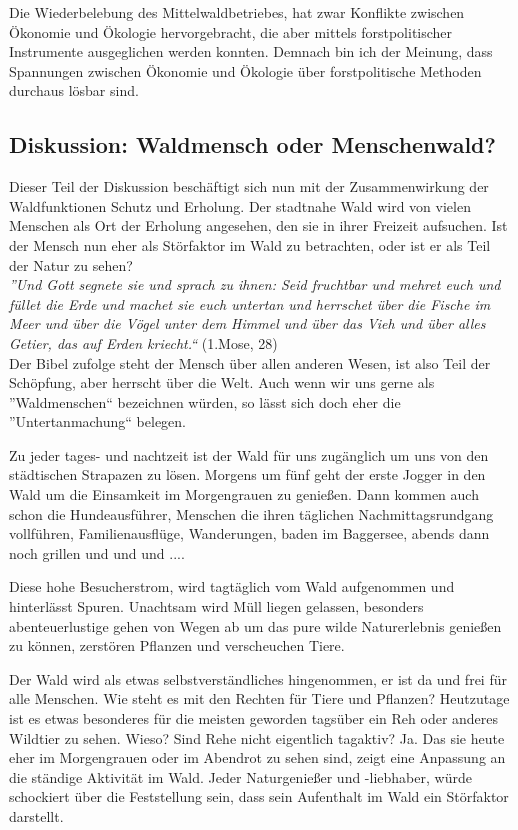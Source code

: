 \documentclass[12pt]{article}
\begin{document}
Die Wiederbelebung des Mittelwaldbetriebes, hat zwar Konflikte
zwischen Ökonomie und Ökologie hervorgebracht, die aber mittels forstpolitischer Instrumente ausgeglichen
werden konnten. Demnach bin ich der Meinung, dass Spannungen zwischen Ökonomie und Ökologie über forstpolitische 
Methoden durchaus lösbar sind. 


\subsection*{Diskussion: Waldmensch oder Menschenwald?}
Dieser Teil der Diskussion beschäftigt sich nun mit der Zusammenwirkung der Waldfunktionen
Schutz und Erholung. Der stadtnahe Wald wird von vielen Menschen als Ort der Erholung angesehen,
den sie in ihrer Freizeit aufsuchen. Ist der Mensch nun eher als Störfaktor im Wald zu betrachten,
oder ist er als Teil der Natur zu sehen? \\

\noindent \textit{''Und Gott segnete sie und sprach zu ihnen: Seid fruchtbar und mehret euch und füllet die Erde und 
machet sie euch untertan und herrschet über die Fische im Meer und über die Vögel unter dem 
Himmel und über das Vieh und über alles Getier, das auf Erden kriecht.``} (1.Mose, 28) \\

\noindent Der Bibel zufolge steht der Mensch über allen anderen Wesen, ist also Teil der Schöpfung, aber
herrscht über die Welt. Auch wenn wir uns gerne als ''Waldmenschen`` bezeichnen würden, so lässt sich doch
eher die ''Untertanmachung`` belegen. 

Zu jeder tages- und nachtzeit ist der Wald für uns zugänglich um uns von den städtischen Strapazen zu
lösen. Morgens um fünf geht der erste Jogger in den Wald um die Einsamkeit im Morgengrauen zu genießen.
Dann kommen auch schon die Hundeausführer, Menschen die ihren täglichen
Nachmittagsrundgang vollführen, Familienausflüge, Wanderungen, baden im Baggersee, abends dann noch grillen
und und und .... 

Diese hohe Besucherstrom, wird tagtäglich vom Wald aufgenommen und hinterlässt Spuren. Unachtsam wird
Müll liegen gelassen, besonders abenteuerlustige gehen von Wegen ab um das pure wilde Naturerlebnis genießen
zu können, zerstören Pflanzen und verscheuchen Tiere.

Der Wald wird als etwas selbstverständliches hingenommen, er ist da und frei für alle Menschen. 
Wie steht es mit den Rechten für Tiere und Pflanzen? Heutzutage ist es etwas besonderes für
die meisten geworden tagsüber ein Reh oder anderes Wildtier zu sehen. Wieso? Sind Rehe nicht eigentlich
tagaktiv? Ja. Das sie heute eher im Morgengrauen oder im Abendrot zu sehen sind, zeigt eine Anpassung
an die ständige Aktivität im Wald. 
Jeder Naturgenießer und -liebhaber, würde schockiert über die Feststellung sein, dass sein Aufenthalt im
Wald ein Störfaktor darstellt.
\end{document}
